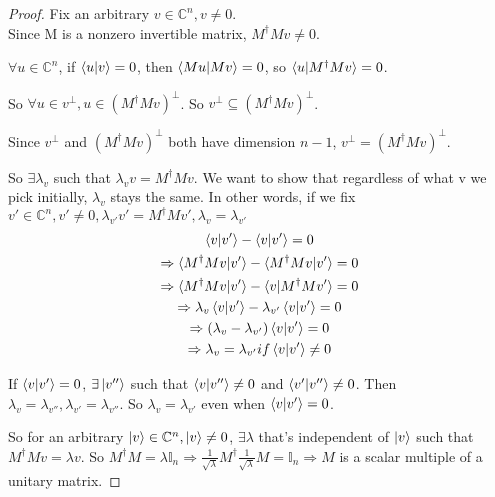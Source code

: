\begin{proof}
Fix an arbitrary $v \in \mathbb{C}^n, v \ne 0$.\\ Since M is a nonzero invertible matrix, $M^\dagger M v \ne 0$.

$\forall u \in \mathbb{C}^n$, if $\braket{u|v}=0$, then $\braket{Mu|Mv}=0$, so $\braket{u|M^\dagger Mv}=0$.

So $\forall u \in v^\perp, u \in (M^\dagger Mv)^\perp$. So $v^\perp \subseteq (M^\dagger Mv)^\perp$.

Since $v^\perp$ and $(M^\dagger Mv)^\perp$ both have dimension $n-1$, $v^\perp = (M^\dagger Mv)^\perp$.

So $\exists \lambda_v$ such that $\lambda_v v = M^\dagger M v$. We want to show that regardless of what v we pick initially, $\lambda_v$ stays the same. In other words, if we fix $v' \in \mathbb{C}^n, v' \ne 0, \lambda_{v'} v' = M^\dagger M v', \lambda_v = \lambda_{v'}$
\begin{gather*}
\braket{v|v'}-\braket{v|v'}=0\\
\Rightarrow \braket{M^\dagger M v|v'}-\braket{M^\dagger M v|v'}=0\\
\Rightarrow \braket{M^\dagger M v|v'}-\braket{v|M^\dagger M v'}=0\\
\Rightarrow \lambda_v \braket{v|v'}-\lambda_{v'} \braket{v|v'}=0\\
\Rightarrow (\lambda_v -\lambda_{v'}) \braket{v|v'}=0\\
\Rightarrow  \lambda_v = \lambda_{v'} if \braket{v|v'} \ne 0
\end{gather*}

If $\braket{v|v'}=0$, $\exists \ket{v''}$ such that $\braket{v|v''} \ne 0$ and $\braket{v'|v''} \ne 0$. Then $\lambda_v =\lambda_{v''}, \lambda_{v'}=\lambda_{v''}$. So $\lambda_v=\lambda_{v'}$ even when $\braket{v|v'}=0$.

So for an arbitrary $\ket{v} \in \mathbb{C}^n, \ket{v} \ne 0$, $\exists \lambda$ that's independent of $\ket{v}$ such that $M^\dagger M v = \lambda v$. So $M^\dagger M=\lambda \mathbb{I}_n\Rightarrow \frac{1}{\sqrt{\lambda}}M^\dagger \frac{1}{\sqrt{\lambda}} M=\mathbb{I}_n\Rightarrow M$ is a scalar multiple of a unitary matrix.
\end{proof}



